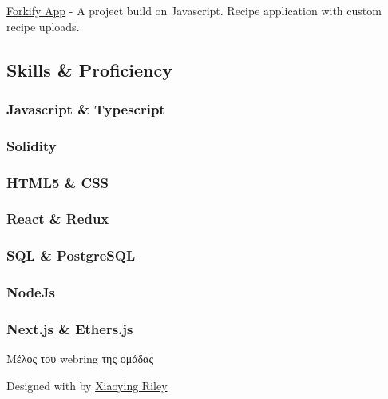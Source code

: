 \documentclass[
  english,
]{article}
\begin{document}
{ \href{https://github.com/CptMike/ForkifyApp}{Forkify App} } - {A
project build on Javascript. Recipe application with custom recipe
uploads.}

\hypertarget{skills-proficiency}{%
\subsection{\texorpdfstring{{ \emph{} \emph{} } Skills \&
Proficiency}{    Skills \& Proficiency}}\label{skills-proficiency}}

\hypertarget{javascript-typescript}{%
\subsubsection{Javascript \& Typescript}\label{javascript-typescript}}

\hypertarget{solidity}{%
\subsubsection{Solidity}\label{solidity}}

\hypertarget{html5-css}{%
\subsubsection{HTML5 \& CSS}\label{html5-css}}

\hypertarget{react-redux}{%
\subsubsection{React \& Redux}\label{react-redux}}

\hypertarget{sql-postgresql}{%
\subsubsection{SQL \& PostgreSQL}\label{sql-postgresql}}

\hypertarget{nodejs}{%
\subsubsection{NodeJs}\label{nodejs}}

\hypertarget{next.js-ethers.js}{%
\subsubsection{Next.js \& Ethers.js}\label{next.js-ethers.js}}

Μέλος του webring της ομάδας
\href{https://cont1nental.netlify.app/\%22\%3ECont1nental\%3C/a\%3E\%20webring\%3C/p\%3E\%0A\%20\%20\%20\%20\%20\%20\%3Ca\%20href=}{}
\href{https://cont1nental.netlify.app/random\%22\%3EΤυχαία\%20σελίδα\%3C/a\%3E\%0A\%20\%20\%20\%20\%20\%20\%3Ca\%20href=}{}

{Designed with \emph{} by \href{http://themes.3rdwavemedia.com}{Xiaoying
Riley}}
\end{document}
